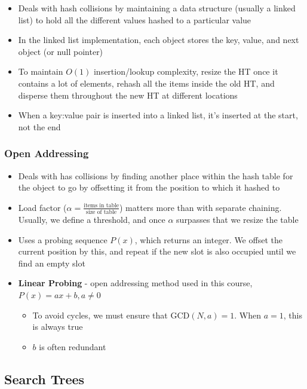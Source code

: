\documentclass{article}
\begin{document}
\begin{itemize}
    \item Deals with hash collisions by maintaining a data structure (usually a linked list) to hold all the different values hashed to a particular value
    \item In the linked list implementation, each object stores the key, value, and next object (or null pointer)
    \item To maintain $O(1)$ insertion/lookup complexity, resize the HT once it contains a lot of elements, rehash all the items inside the old HT, and disperse them throughout the new HT at different locations
    \item When a key:value pair is inserted into a linked list, it's inserted at the start, not the end
\end{itemize}

\subsubsection{Open Addressing}

\begin{itemize}
    \item Deals with has collisions by finding another place within the hash table for the object to go by offsetting it from the position to which it hashed to
    \item Load factor ($\alpha = \frac{\text{items in table}}{\text{size of table}}$) matters more than with separate chaining. Usually, we define a threshold, and once $\alpha$ surpasses that we resize the table
    \item Uses a probing sequence $P(x)$, which returns an integer. We offset the current position by this, and repeat if the new slot is also occupied until we find an empty slot
    \item \textbf{Linear Probing} - open addressing method used in this course, $P(x)=ax+b, a \ne 0$
    \begin{itemize}
        \item To avoid cycles, we must ensure that $\text{GCD}(N,a)=1$. When $a=1$, this is always true
        \item $b$ is often redundant
    \end{itemize}
\end{itemize}

\subsection{Search Trees}
\end{document}
